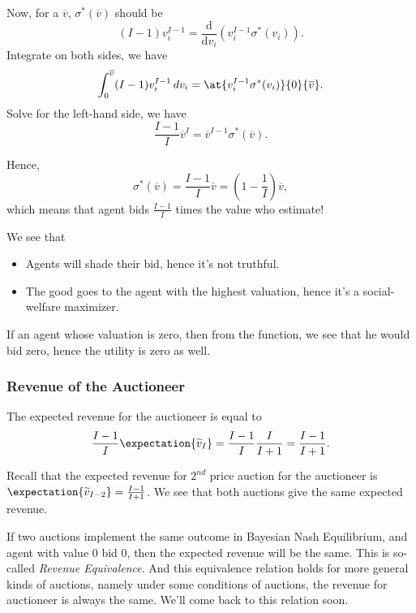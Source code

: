 \par Now, for a \(\overline{v}\), \(\sigma^{*}(\overline{v})\) should be
\[
	(I - 1)v_{i}^{I-1} = \frac{\mathrm{d}}{\mathrm{d}v_{i}} \left(v_{i}^{I-1}\sigma^{*}(v_{i})\right).
\]
Integrate on both sides, we have
\[
	\int_0^{\overline{v}}(I - 1)v_{i}^{I-1}\,d v_{i} = \at{v_{i}^{I-1}\sigma^{*}(v_{i})}{0}{\overline{v}}.
\]
Solve for the left-hand side, we have
\[
	\frac{I - 1}{I}\overline{v}^I = \overline{v}^{I-1}\sigma^{*}(\overline{v}).
\]

Hence,
\[
	\sigma^{*}(\overline{v}) = \frac{I-1}{I}\overline{v} = (1 - \frac{1}{I})\overline{v},
\]
which means that agent bids \(\frac{I - 1}{I}\) times the value who estimate!

\begin{note}
	We see that
	\begin{itemize}
		\item Agents will shade their bid, hence it's not truthful.
		\item The good goes to the agent with the highest valuation, hence it's a social-welfare maximizer.
	\end{itemize}
\end{note}

\begin{remark}
	If an agent whose valuation is zero, then from the function, we see that he would bid zero, hence the utility is zero as well.
\end{remark}

\subsubsection{Revenue of the Auctioneer}
The expected revenue for the auctioneer is equal to
\[
	\frac{I - 1}{I}\expectation{\widetilde{v}_I} = \frac{I - 1}{I}\frac{I}{I+1} = \frac{I - 1}{I+1}.
\]

\begin{remark}
	Recall that the expected revenue for \(2^{nd}\) price auction for the auctioneer is \(\expectation{\widetilde{v}_{I-2}} = \frac{I-1}{I+1}\).
	We see that both auctions give the same expected revenue.
\end{remark}

\begin{note}
	If two auctions implement the same outcome in Bayesian Nash Equilibrium, and agent with value \(0\) bid \(0\), then the expected
	revenue will be the same. This is so-called \emph{Revenue Equivalence}. And this equivalence relation holds for more general kinds of
	auctions, namely under some conditions of auctions, the revenue for auctioneer is always the same. We'll come back to this
	relation soon.
\end{note}

